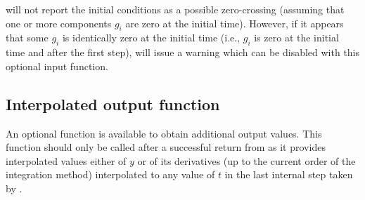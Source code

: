 {
  {\cvode} will not report the initial conditions as a possible zero-crossing
  (assuming that one or more components $g_i$ are zero at the initial time).
  However, if it appears that some $g_i$ is identically zero at the initial
  time (i.e., $g_i$ is zero at the initial time and after the first step),
  {\cvode} will issue a warning which can be disabled with this optional input
  function.
}

\subsection{Interpolated output function}\label{ss:optional_dky}

An optional function  is available to obtain additional
output values.  This function should only be called after a successful
return from  as it provides interpolated values either of
$y$ or of its derivatives (up to the current order of the integration
method) interpolated to any value of $t$ in the last internal step
taken by {\cvode}.

